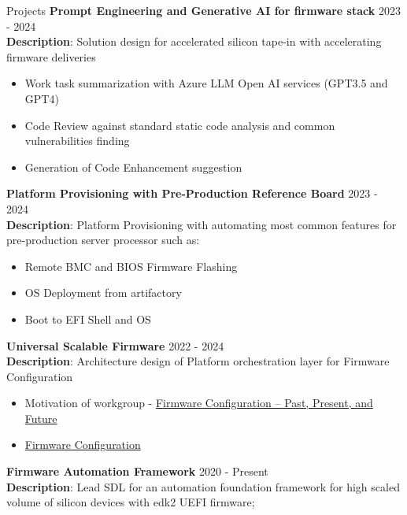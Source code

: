 \documentclass{resume} %
\begin{document}
\begin{rSection}{Projects}
{\bf Prompt Engineering and Generative AI for firmware stack} \hfill {2023 - 2024}\\
\textbf{Description}: Solution design for accelerated silicon tape-in with accelerating firmware deliveries

\begin{itemize}
    \item Work task summarization with Azure LLM Open AI services (GPT3.5 and GPT4)
    \item Code Review against standard static code analysis and common vulnerabilities finding
    \item Generation of Code Enhancement suggestion
\end{itemize}

\textbf{Platform Provisioning with Pre-Production Reference Board} \hfill {2023 - 2024}\\
\textbf{Description}: Platform Provisioning with automating most common features for pre-production server processor such as:

\begin{itemize}
    \item Remote BMC and BIOS Firmware Flashing
    \item OS Deployment from artifactory
    \item Boot to EFI Shell and OS
\end{itemize}

\textbf{Universal Scalable Firmware} \hfill {2022 - 2024} \\
\textbf{Description}: Architecture design of Platform orchestration layer for Firmware Configuration

\begin{itemize}
    \item Motivation of workgroup - \href{https://uefi.org/sites/default/files/resources/Firmware%20Configuration%20%E2%80%93%20Past%2C%20Present%2C%20and%20Future_Zimmer.pdf}{Firmware Configuration – Past, Present, and Future}
    \item \href{https://universalscalablefirmware.github.io/documentation/7_yaml_boot_configuration.html}{Firmware Configuration}
\end{itemize}

\textbf{Firmware Automation Framework}  \hfill {2020 - Present} \\
\textbf{Description}: Lead SDL for an automation foundation framework for high scaled volume of silicon devices with edk2 UEFI firmware;


\end{rSection}
\end{document}
